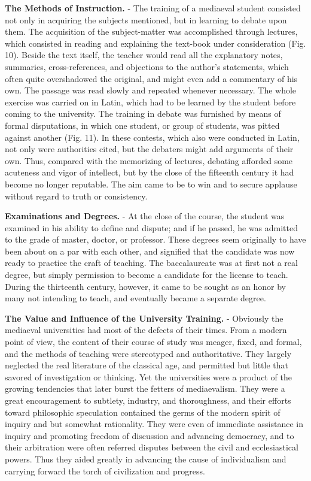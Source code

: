 \documentclass[
]{book}
\begin{document}
\textbf{The Methods of Instruction.} - The training of a mediaeval student consisted not only in acquiring the subjects mentioned, but in learning to debate upon them. The acquisition of the subject-matter was accomplished through lectures, which consisted in reading and explaining the text-book under consideration (Fig. 10). Beside the text itself, the teacher would read all the explanatory notes, summaries, cross-references, and objections to the author's statements, which often quite overshadowed the original, and might even add a commentary of his own. The passage was read slowly and repeated whenever necessary. The whole exercise was carried on in Latin, which had to be learned by the student before coming to the university. The training in debate was furnished by means of formal disputations, in which one student, or group of students, was pitted against another (Fig. 11). In these contests, which also were conducted in Latin, not only were authorities cited, but the debaters might add arguments of their own. Thus, compared with the memorizing of lectures, debating afforded some acuteness and vigor of intellect, but by the close of the fifteenth century it had become no longer reputable. The aim came to be to win and to secure applause without regard to truth or consistency.

\textbf{Examinations and Degrees.} - At the close of the course, the student was examined in his ability to define and dispute; and if he passed, he was admitted to the grade of master, doctor, or professor. These degrees seem originally to have been about on a par with each other, and signified that the candidate was now ready to practice the craft of teaching. The baccalaureate was at first not a real degree, but simply permission to become a candidate for the license to teach. During the thirteenth century, however, it came to be sought as an honor by many not intending to teach, and eventually became a separate degree.

\textbf{The Value and Influence of the University Training.} - Obviously the mediaeval universities had most of the defects of their times. From a modern point of view, the content of their course of study was meager, fixed, and formal, and the methods of teaching were stereotyped and authoritative. They largely neglected the real literature of the classical age, and permitted but little that savored of investigation or thinking. Yet the universities were a product of the growing tendencies that later burst the fetters of mediaevalism. They were a great encouragement to subtlety, industry, and thoroughness, and their efforts toward philosophic speculation contained the germs of the modern spirit of inquiry and but somewhat rationality. They were even of immediate assistance in inquiry and promoting freedom of discussion and advancing democracy, and to their arbitration were often referred disputes between the civil and ecclesiastical powers. Thus they aided greatly in advancing the cause of individualism and carrying forward the torch of civilization and progress.
\end{document}
